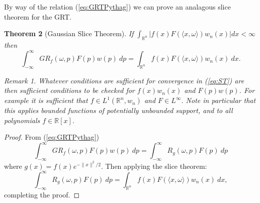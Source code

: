 \documentclass{amsart}
\newtheorem{theorem}{Theorem}[section]
\theoremstyle{remark}
\newtheorem{remark}[theorem]{Remark}
\numberwithin{equation}{section}
\newcommand{\RR}{\mathbb{R}}
\begin{document}
By way of the relation (\ref{eq:GRTPythag}) we can prove an analagous slice theorem for the GRT. 
\begin{theorem}[Gaussian Slice Theorem] If $\int_{\mathbb{R}^n} |f(x) F(\langle x, \omega\rangle) w_n(x)| dx < \infty$ then
\begin{equation}\label{eq:GST}
    \int_{-\infty}^\infty GR_f(\omega, p)F(p) w(p) ~dp
    = \int_{\mathbb{R}^n}f(x) F(\langle x, \omega\rangle) w_n(x) ~dx. 
\end{equation}
\begin{remark}
Whatever conditions are sufficient for convergence in (\ref{eq:ST}) are then sufficient conditions to be checked for $f(x)w_n(x)$ and $F(p)w(p)$. For example it is sufficient that $f \in L^1(\RR^n, w_n)$ and $F \in L^\infty$. Note in particular that this applies bounded functions of potentially unbounded support, and to all polynomials $f \in \RR[x]$.
\end{remark}
\end{theorem}
\begin{proof}
From (\ref{eq:GRTPythag})
\[
    \int_{-\infty}^\infty GR_f(\omega, p)F(p) w(p) ~dp 
    = \int_{-\infty}^\infty R_g(\omega, p) F(p) ~dp
\]
where $g(x) = f(x)e^{-\|x\|^2/2}$. Then applying the slice theorem:
\[
    \int_{-\infty}^\infty R_g(\omega, p) F(p) ~dp 
    = \int_{\RR^n} f(x)F(\langle x, \omega \rangle) w_n(x) ~dx,
\]
completing the proof.
\end{proof}

\end{document}

